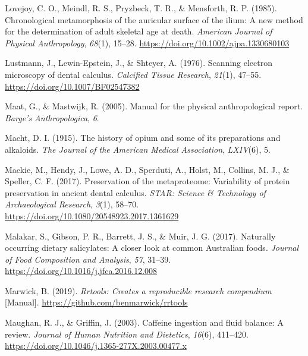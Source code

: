 \documentclass[
]{article}
\newlength{\cslhangindent}
\newlength{\cslentryspacingunit} %
\newenvironment{CSLReferences}[2] %
 {%
  \setlength{\parindent}{0pt}
  \ifodd #1
  \let\oldpar\par
  \def\par{\hangindent=\cslhangindent\oldpar}
  \fi
  \setlength{\parskip}{#2\cslentryspacingunit}
 }%
 {}
\begin{document}
\begin{CSLReferences}{1}{0}
\leavevmode{}%
Lovejoy, C. O., Meindl, R. S., Pryzbeck, T. R., \& Mensforth, R. P.
(1985). Chronological metamorphosis of the auricular surface of the
ilium: {A} new method for the determination of adult skeletal age at
death. \emph{American Journal of Physical Anthropology}, \emph{68}(1),
15--28. \url{https://doi.org/10.1002/ajpa.1330680103}

\leavevmode{}%
Lustmann, J., Lewin-Epstein, J., \& Shteyer, A. (1976). Scanning
electron microscopy of dental calculus. \emph{Calcified Tissue
Research}, \emph{21}(1), 47--55.
\url{https://doi.org/10.1007/BF02547382}

\leavevmode{}%
Maat, G., \& Mastwijk, R. (2005). Manual for the physical
anthropological report. \emph{Barge's Anthropologica}, \emph{6}.

\leavevmode{}%
Macht, D. I. (1915). The history of opium and some of its preparations
and alkaloids. \emph{The Journal of the American Medical Association},
\emph{LXIV}(6), 5.

\leavevmode{}%
Mackie, M., Hendy, J., Lowe, A. D., Sperduti, A., Holst, M., Collins, M.
J., \& Speller, C. F. (2017). Preservation of the metaproteome:
Variability of protein preservation in ancient dental calculus.
\emph{STAR: Science \& Technology of Archaeological Research},
\emph{3}(1), 58--70. \url{https://doi.org/10.1080/20548923.2017.1361629}

\leavevmode{}%
Malakar, S., Gibson, P. R., Barrett, J. S., \& Muir, J. G. (2017).
Naturally occurring dietary salicylates: {A} closer look at common
{Australian} foods. \emph{Journal of Food Composition and Analysis},
\emph{57}, 31--39. \url{https://doi.org/10.1016/j.jfca.2016.12.008}

\leavevmode{}%
Marwick, B. (2019). \emph{Rrtools: {Creates} a reproducible research
compendium} {[}Manual{]}. \url{https://github.com/benmarwick/rrtools}

\leavevmode{}%
Maughan, R. J., \& Griffin, J. (2003). Caffeine ingestion and fluid
balance: A review. \emph{Journal of Human Nutrition and Dietetics},
\emph{16}(6), 411--420.
\url{https://doi.org/10.1046/j.1365-277X.2003.00477.x}


\end{CSLReferences}
\end{document}
